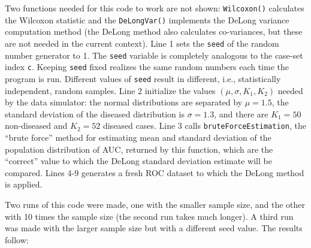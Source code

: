 \documentclass[
]{book}
\begin{document}
Two functions needed for this code to work are not shown: \texttt{Wilcoxon()} calculates the Wilcoxon statistic and the \texttt{DeLongVar()} implements the DeLong variance computation method (the DeLong method also calculates co-variances, but these are not needed in the current context). Line 1 sets the \texttt{seed} of the random number generator to 1. The \texttt{seed} variable is completely analogous to the case-set index \texttt{c}. Keeping \texttt{seed} fixed realizes the same random numbers each time the program is run. Different values of \texttt{seed} result in different, i.e., statistically independent, random samples. Line 2 initialize the values \((\mu, \sigma, K_1, K_2)\) needed by the data simulator: the normal distributions are separated by \(\mu = 1.5\), the standard deviation of the diseased distribution is \(\sigma = 1.3\), and there are \(K_1 = 50\) non-diseased and \(K_2 = 52\) diseased cases. Line 3 calls \texttt{bruteForceEstimation}, the ``brute force'' method for estimating mean and standard deviation of the population distribution of AUC, returned by this function, which are the ``correct'' value to which the DeLong standard deviation estimate will be compared. Lines 4-9 generates a fresh ROC dataset to which the DeLong method is applied.

Two runs of this code were made, one with the smaller sample size, and the other with 10 times the sample size (the second run takes much longer). A third run was made with the larger sample size but with a different seed value. The results follow:
\end{document}
